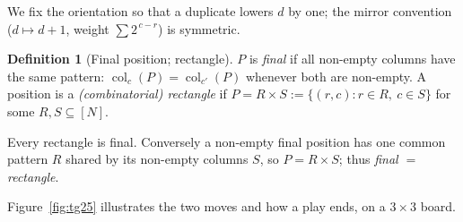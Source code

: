 \documentclass[11pt]{article}
\theoremstyle{definition}
\newtheorem{definition}{Definition}
\theoremstyle{plain}
\theoremstyle{remark}
\newcommand{\col}{\operatorname{col}}
\begin{document}
We fix the orientation so that a duplicate lowers $d$ by one; the mirror
convention ($d\mapsto d+1$, weight $\sum 2^{\,c-r}$) is symmetric.

\begin{definition}[Final position; rectangle]
$P$ is \emph{final} if all non-empty columns have the same pattern:
$\col_c(P)=\col_{c'}(P)$ whenever both are non-empty.  A position is a
\emph{(combinatorial) rectangle} if $P=R\times S:=\{(r,c):r\in R,\ c\in S\}$ for
some $R,S\subseteq[N]$.
\end{definition}

Every rectangle is final.  Conversely a non-empty final position has one common
pattern $R$ shared by its non-empty columns $S$, so $P=R\times S$; thus
\emph{final $=$ rectangle}.

Figure~\ref{fig:tg25} illustrates the two moves and how a play ends, on a $3\times3$ board.
\end{document}
